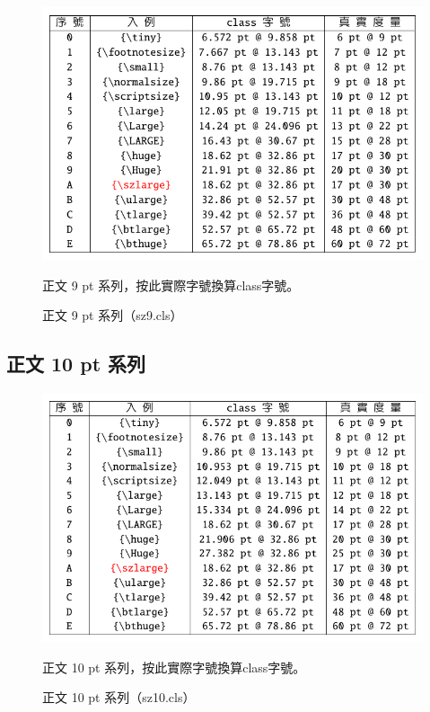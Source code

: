 \begin{figure}[H]
\begin{center}
\caption{正文 9 pt 系列（sz9.cls）}
{ \includegraphics[scale=1]{figures/sz9.pdf}}
\end{center}
\par 正文 9 pt 系列，按此實際字號換算class字號。
\end{figure}

\subsection{正文 10 pt 系列}
\begin{figure}[H]
\begin{center}
\caption{正文 10 pt 系列（sz10.cls）}
{ \includegraphics[scale=1]{figures/sz10.pdf}}
\end{center}
\par 正文 10 pt 系列，按此實際字號換算class字號。
\end{figure}

